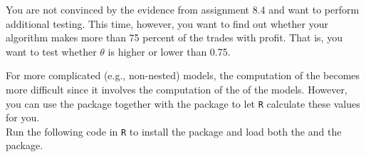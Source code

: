 \setcounter{section}{8}
\setcounter{subsection}{5}
\setcounter{question}{0}



You are not convinced by the evidence from assignment 8.4 and want to perform additional testing. This time, however, you want to find out whether your algorithm makes more than 75 percent of the trades with profit. That is, you want to test whether $\theta$ is higher or lower than 0.75.\\



For more complicated (e.g., non-nested) models, the computation of the  becomes more difficult since it involves the computation of the  of the models. However, you can use the  package together with the  package to let \texttt{R} calculate these values for you. \\

Run the following code in \texttt{R} to install the  package and load both the  and the  package. \\
\\

